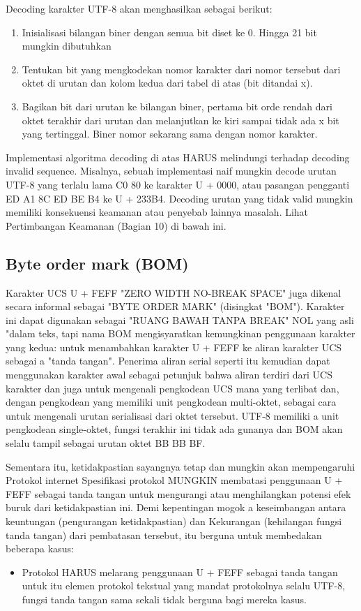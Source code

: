\begin{tabel}[H]
   Decoding karakter UTF-8 akan menghasilkan sebagai berikut:
   \begin{enumerate}
   \item Inisialisasi bilangan biner dengan semua bit diset ke 0. Hingga 21 bit
       mungkin dibutuhkan

   \item Tentukan bit yang mengkodekan nomor karakter dari nomor tersebut
       dari oktet di urutan dan kolom kedua dari tabel
       di atas (bit ditandai x).

   \item Bagikan bit dari urutan ke bilangan biner, pertama
       bit orde rendah dari oktet terakhir dari urutan dan
       melanjutkan ke kiri sampai tidak ada x bit yang tertinggal. Biner
       nomor sekarang sama dengan nomor karakter.
    \end{enumerate}
   Implementasi algoritma decoding di atas HARUS melindungi terhadap
   decoding invalid sequence. Misalnya, sebuah implementasi naif mungkin
   decode urutan UTF-8 yang terlalu lama C0 80 ke karakter U + 0000,
   atau pasangan pengganti ED A1 8C ED BE B4 ke U + 233B4. Decoding
   urutan yang tidak valid mungkin memiliki konsekuensi keamanan atau penyebab lainnya
   masalah. Lihat Pertimbangan Keamanan (Bagian 10) di bawah ini.

	\subsection{Byte order mark (BOM)}
   Karakter UCS U + FEFF "ZERO WIDTH NO-BREAK SPACE" juga dikenal
   secara informal sebagai "BYTE ORDER MARK" (disingkat "BOM"). Karakter ini
   dapat digunakan sebagai "RUANG BAWAH TANPA BREAK" NOL yang asli "dalam teks, tapi
   nama BOM mengisyaratkan kemungkinan penggunaan karakter yang kedua: untuk
   menambahkan karakter U + FEFF ke aliran karakter UCS sebagai a
   "tanda tangan". Penerima aliran serial seperti itu kemudian dapat menggunakan
   karakter awal sebagai petunjuk bahwa aliran terdiri dari UCS
   karakter dan juga untuk mengenali pengkodean UCS mana yang terlibat dan,
   dengan pengkodean yang memiliki unit pengkodean multi-oktet, sebagai cara untuk mengenali urutan serialisasi dari oktet tersebut. UTF-8 memiliki a
   unit pengkodean single-oktet, fungsi terakhir ini tidak ada gunanya dan BOM
   akan selalu tampil sebagai urutan oktet BB BB BF.

Sementara itu, ketidakpastian sayangnya tetap dan mungkin akan mempengaruhi
   Protokol internet Spesifikasi protokol MUNGKIN membatasi penggunaan
   U + FEFF sebagai tanda tangan untuk mengurangi atau menghilangkan potensi
   efek buruk dari ketidakpastian ini. Demi kepentingan mogok a
   keseimbangan antara keuntungan (pengurangan ketidakpastian) dan
   Kekurangan (kehilangan fungsi tanda tangan) dari pembatasan tersebut, itu
   berguna untuk membedakan beberapa kasus:
\begin{itemize}
    \item Protokol HARUS melarang penggunaan U + FEFF sebagai tanda tangan untuk itu
      elemen protokol tekstual yang mandat protokolnya selalu
      UTF-8, fungsi tanda tangan sama sekali tidak berguna bagi mereka
      kasus.


\end{itemize}
\end{tabel}
